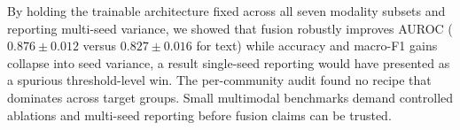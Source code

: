 \documentclass{article}
\begin{document}
By holding the trainable architecture fixed across all seven modality subsets and reporting multi-seed variance, we showed that fusion robustly improves AUROC ($0.876 \pm 0.012$ versus $0.827 \pm 0.016$ for text) while accuracy and macro-F1 gains collapse into seed variance, a result single-seed reporting would have presented as a spurious threshold-level win. The per-community audit found no recipe that dominates across target groups. Small multimodal benchmarks demand controlled ablations and multi-seed reporting before fusion claims can be trusted.

{\scriptsize
\setlength{\bibsep}{0pt plus 0.3ex}


}
\end{document}

